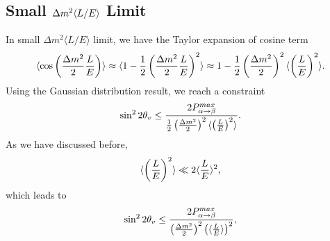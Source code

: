 \documentclass[letterpaper,12pt,english]{sphinxmanual}
\begin{document}
\subsection{Small \protect\(\Delta m^2 \langle L/E \rangle\protect\) Limit}
\label{experiments:small-limit}
In small \(\Delta m^2 \langle L/E \rangle\) limit, we have the Taylor expansion of cosine term
\begin{gather}
\begin{split}\langle \cos \left( \frac{\Delta m^2}{2} \frac{L}{E} \right)\rangle \approx \langle 1- \frac{1}{2}\left( \frac{\Delta m^2}{2} \frac{L}{E} \right)^2 \rangle  \approx 1 - \frac{1}{2} \left(\frac{\Delta m^2}{2} \right)^2 \langle \left( \frac{L}{E} \right)^2 \rangle.\end{split}\notag
\end{gather}
Using the Gaussian distribution result, we reach a constraint
\begin{gather}
\begin{split}\sin^2 2\theta_v \leq \frac{2 P_{\alpha\to\beta}^{max} }{\frac{1}{2} \left( \frac{\Delta m^2}{2}  \right)^2 \langle \left(\frac{L}{E}\right)^2 \rangle}.\end{split}\notag
\end{gather}
As we have discussed before,
\begin{gather}
\begin{split}\langle \left(\frac{L}{E} \right)^2 \rangle \ll 2\langle \frac{L}{E}\rangle^2,\end{split}\notag
\end{gather}
which leads to
\begin{gather}
\begin{split}\sin^2 2\theta_v \leq \frac{2 P_{\alpha\to\beta}^{max} }{ \left( \frac{\Delta m^2}{2}  \right)^2  \left(\langle\frac{L}{E} \rangle\right)^2 },\end{split}\notag
\end{gather}
\end{document}
